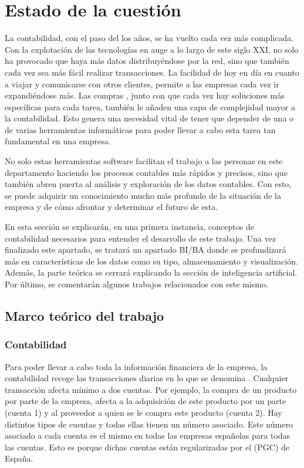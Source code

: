 
\pagestyle{plain}

\section{Estado de la cuestión}
La contabilidad, con el paso del los años, se ha vuelto cada vez más complicada. Con la explotación de las tecnologías en auge a lo largo de este siglo XXI, no solo ha provocado que haya más datos distribuyéndose por la red, sino que también cada vez sea más fácil realizar transacciones. La facilidad de hoy en día en cuanto a viajar y comunicarse con otros clientes, permite a las empresas cada vez ir expandiéndose más. Las compras , junto con que cada vez hay soluciones más específicas para cada tarea, también le añaden una capa de complejidad mayor a la contabilidad. Esto genera una necesidad vital de tener que depender de una o de varias herramientas informáticas para poder llevar a cabo esta tarea tan fundamental en una empresa.

No solo estas herramientas software facilitan el trabajo a las personas en este departamento haciendo los procesos contables más rápidos y precisos, sino que también abren puerta al análisis y exploración de los datos contables. Con esto, se puede adquirir un conocimiento mucho más profundo de la situación de la empresa y de cómo afrontar y determinar el futuro de esta. 

En esta sección se explicarán, en una primera instancia, conceptos de contabilidad necesarios para entender el desarrollo de este trabajo. Una vez finalizado este apartado, se tratará un apartado BI/BA donde se profundizará más en características de los datos como su tipo, almacenamiento y visualización. Además, la parte teórica se cerrará explicando la sección de inteligencia artificial. Por último, se comentarán algunos trabajos relacionados con este mismo.

\subsection{Marco teórico del trabajo}
\subsubsection{Contabilidad}
Para poder llevar a cabo toda la información financiera de la empresa, la contabilidad recoge las transacciones diarias en lo que se denomina . Cualquier transacción afecta mínimo a dos cuentas. Por ejemplo, la compra de un producto por parte de la empresa, afecta a la adquisición de este producto por un parte (cuenta 1) y al proveedor a quien se le compra este producto (cuenta 2). Hay distintos tipos de cuentas y todas ellas tienen un número asociado. Este número asociado a cada cuenta es el mismo en todas las empresas españolas para todas las  cuentas. Esto es porque dichas cuentas están regularizadas por el  (PGC) de España.

